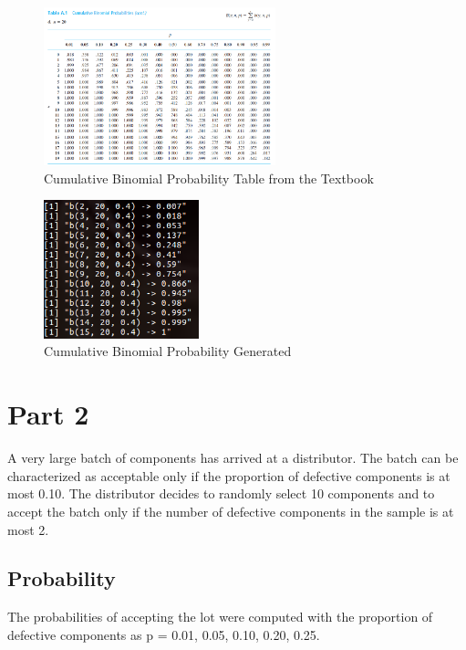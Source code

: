 \documentclass{article}
\begin{document}
            \begin{figure}[h]
                \begin{center}
                    \includegraphics[width=0.6\textwidth]{figures/binom_table.png}
                    \caption{Cumulative Binomial Probability Table from the Textbook} \label{fig:binom_table}
                \end{center}
            \end{figure}


            \begin{figure}[h]
                \begin{center}
                    \includegraphics[width=0.4\textwidth]{figures/cumProb.png}
                    \caption{Cumulative Binomial Probability Generated} \label{fig:cumProb}
                \end{center}
            \end{figure}

    \section{Part 2}
    A very large batch of components has arrived at a distributor. The batch can be characterized as acceptable only if the proportion of defective components is at most 0.10. The distributor decides to randomly select 10 components and to accept the batch only if the number of defective components in the sample is at most 2.

        \subsection{Probability}
            The probabilities of accepting the lot were computed with the proportion of defective components as p = 0.01, 0.05, 0.10, 0.20, 0.25.
\end{document}
